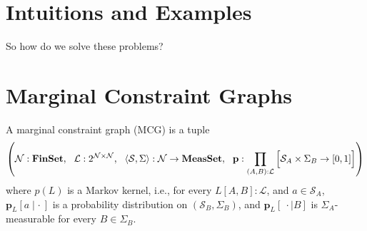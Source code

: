 \documentclass{article}
\begin{document}
%	
%	
%	
	
	



	\part{Intuitions and Examples}
	So how do we solve these problems?
	
	
	\section{}

	
	\part{Marginal Constraint Graphs}
	
	\begin{defn}\label{def:mcg}
		A marginal constraint graph (MCG) is a tuple 
		\[ \left(\mathcal N : \mathbf{FinSet},~~\mathcal L : 2^{\cal N \times N},~~ \langle\mathcal S, \Sigma\rangle : \mathcal N \to \mathbf{MeasSet}, ~~\mathbf p : \prod_{(A,B): \mathcal L} \left[ \Big. \mathcal S_A \times \Sigma_B \to [0,1]\right] \right) \]
		where $p(L)$ is a Markov kernel, i.e., for every $L[A,B] : \mathcal L$, and $a \in \mathcal S_A$, $\mathbf p_L[a \mid \cdot~]$ is a probability distribution on $(\mathcal S_B, \Sigma_B)$, and $\mathbf p_L[~\cdot \mid B]$ is $\Sigma_A$-measurable for every $B \in \Sigma_B$.
	\end{defn}
\end{document}
